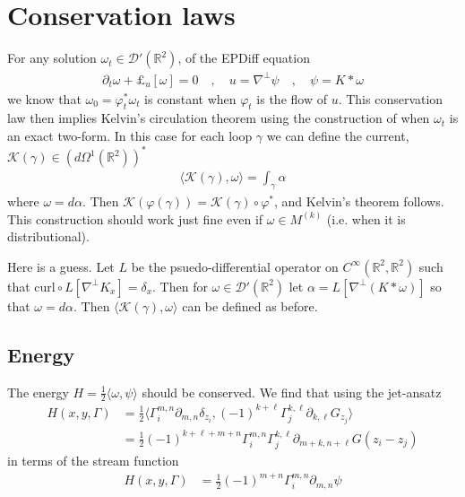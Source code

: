 \documentclass[12pt]{amsart}
\newcommand{\R}{\ensuremath{\mathbb{R}}}
\begin{document}
\section{Conservation laws}
\label{sec:conservation}
For any solution $\omega_t \in \mathcal{D}'(\R^2)$, of the EPDiff equation
\begin{align*}
  \partial_t \omega + \pounds_u [\omega] = 0 \quad,\quad u = \nabla^\perp \psi \quad,\quad \psi = K*\omega
\end{align*}
we know that $\omega_0 = \varphi_t^* \omega_t$ is constant
when $\varphi_t$ is the flow of $u$.
This conservation law then implies Kelvin's circulation theorem
using the construction of \cite{HolmMarsdenRatiu1998}
when $\omega_t$ is an exact two-form.
In this case for each loop $\gamma$
we can define the current, $\mathcal{K}(\gamma) \in  \left( d \Omega^1 (\R^2) \right)^*$
\begin{align*}
  \langle \mathcal{K}(\gamma) , \omega \rangle = \int_{\gamma} \alpha
\end{align*}
where $\omega = d\alpha$.
Then $\mathcal{K}( \varphi (\gamma) ) = \mathcal{K}(\gamma) \circ \varphi^*$, and Kelvin's theorem follows.
This construction should work just fine even if $\omega \in M^{(k)}$ (i.e. when it is distributional).

Here is a guess.
Let $L$ be the psuedo-differential operator on $C^\infty(\R^2,\R^2)$
such that $\mathrm{curl} \circ L[ \nabla^\perp K_x] = \delta_x$.
Then for $\omega \in \mathcal{D}'(\R^2)$ let $\alpha = L[\nabla^\perp (K*\omega)]$ so that $\omega = d\alpha$.  Then $\langle \mathcal{K}(\gamma) , \omega \rangle$ can be defined as before.

\subsection{Energy}
The energy $H =  \frac{1}{2} \langle \omega , \psi \rangle$ should be conserved.  We find that using the jet-ansatz
\begin{align*}
  H(x,y,\Gamma) &= \frac{1}{2} \langle \Gamma_i^{m,n} \partial_{m,n} \delta_{z_i} ,
  (-1)^{k+\ell} \Gamma_j^{k,\ell} \partial_{k,\ell} G_{z_j} \rangle \\
  &= \frac{1}{2} (-1)^{k+\ell+m+n} \Gamma_i^{m,n}\Gamma_j^{k,\ell} \partial_{m+k,n+\ell}G(z_i - z_j)
\end{align*}
in terms of the stream function
\begin{align*}
  H(x,y,\Gamma) &= \frac{1}{2} (-1)^{m+n}\Gamma_i^{m,n} \partial_{m,n} \psi
\end{align*}
\end{document}
